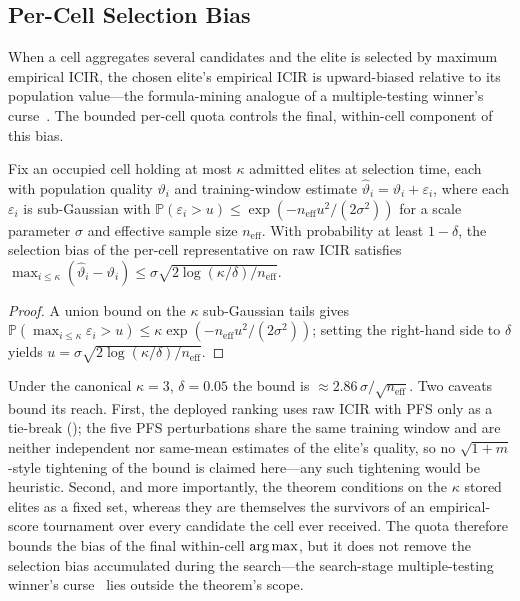 \subsection{Per-Cell Selection Bias}
\label{sec:alphaqd_selection}

When a cell aggregates several candidates and the elite is selected by maximum empirical ICIR, the chosen elite's empirical ICIR is upward-biased relative to its population value---the formula-mining analogue of a multiple-testing winner's curse~\cite{harvey2016cross}. The bounded per-cell quota controls the final, within-cell component of this bias.

\begin{theorem}
\label{thm:alphaqd_selection}
Fix an occupied cell holding at most $\kappa$ admitted elites at selection time, each with population quality $\vartheta_i$ and training-window estimate $\hat\vartheta_i=\vartheta_i+\varepsilon_i$, where each $\varepsilon_i$ is sub-Gaussian with $\mathbb{P}(\varepsilon_i>u)\le\exp(-n_{\mathrm{eff}}u^2/(2\sigma^2))$ for a scale parameter $\sigma$ and effective sample size $n_{\mathrm{eff}}$. With probability at least $1-\delta$, the selection bias of the per-cell representative on raw ICIR satisfies $\max_{i\le\kappa}(\hat\vartheta_i-\vartheta_i)\le\sigma\sqrt{2\log(\kappa/\delta)/n_{\mathrm{eff}}}$.
\end{theorem}
\begin{proof}
A union bound on the $\kappa$ sub-Gaussian tails gives $\mathbb{P}(\max_{i\le\kappa}\varepsilon_i>u)\le\kappa\exp(-n_{\mathrm{eff}}u^2/(2\sigma^2))$; setting the right-hand side to $\delta$ yields $u=\sigma\sqrt{2\log(\kappa/\delta)/n_{\mathrm{eff}}}$.
\end{proof}

Under the canonical $\kappa=3$, $\delta=0.05$ the bound is $\approx 2.86\,\sigma/\sqrt{n_{\mathrm{eff}}}$. Two caveats bound its reach. First, the deployed ranking uses raw ICIR with PFS only as a tie-break (); the five PFS perturbations share the same training window and are neither independent nor same-mean estimates of the elite's quality, so no $\sqrt{1+m}$-style tightening of the bound is claimed here---any such tightening would be heuristic. Second, and more importantly, the theorem conditions on the $\kappa$ stored elites as a fixed set, whereas they are themselves the survivors of an empirical-score tournament over every candidate the cell ever received. The quota therefore bounds the bias of the final within-cell $\operatorname*{arg\,max}$, but it does not remove the selection bias accumulated during the search---the search-stage multiple-testing winner's curse~\cite{harvey2016cross} lies outside the theorem's scope.

